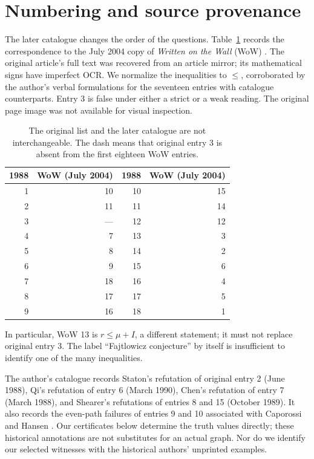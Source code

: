 \documentclass[11pt,a4paper]{article}
\theoremstyle{remark}\newtheorem{remark}[theorem]{Remark}
\begin{document}
\clearpage
\section{Numbering and source provenance}\label{sec:provenance}
The later catalogue changes the order of the questions. Table~\ref{tab:crosswalk}
records the correspondence to the July 2004 copy of \emph{Written on the Wall}
(WoW) \cite{wow}. The original article's full text was recovered from an
article mirror; its mathematical signs have imperfect OCR. We normalize the
inequalities to $\le$, corroborated by the author's verbal formulations for
the seventeen entries with catalogue counterparts. Entry 3 is false under
either a strict or a weak reading. The original page image was not available
for visual inspection.
\begin{table}[H]\centering\small
\begin{tabular}{@{}r r@{\qquad\qquad}r r@{}}\toprule
1988 & WoW (July 2004) & 1988 & WoW (July 2004)\\\midrule
1&10&10&15\\2&11&11&14\\3&---&12&12\\4&7&13&3\\
5&8&14&2\\6&9&15&6\\7&18&16&4\\8&17&17&5\\9&16&18&1\\\bottomrule
\end{tabular}
\caption{The original list and the later catalogue are not interchangeable.
The dash means that original entry 3 is absent from the first eighteen WoW entries.}
\label{tab:crosswalk}
\end{table}
In particular, WoW 13 is $r\le\mu+I$, a different statement; it must not
replace original entry 3. The label ``Fajtlowicz conjecture'' by itself is
insufficient to identify one of the many inequalities.

The author's catalogue records Staton's refutation of original entry 2
(June 1988), Qi's refutation of entry 6 (March 1990), Chen's refutation of
entry 7 (March 1988), and Shearer's refutations of entries 8 and 15
(October 1989). It also records the even-path failures of entries 9 and 10
associated with Caporossi and Hansen \cite[pp.~14--19]{wow}.
Our certificates below determine the truth values directly; these historical
annotations are not substitutes for an actual graph. Nor do we identify our
selected witnesses with the historical authors' unprinted examples.
\end{document}
